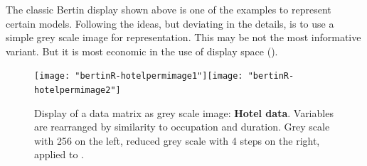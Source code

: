 \documentclass[nogin, dvips,12pt,a4paper,twoside]{amsart}
\begin{document}
The classic Bertin display shown above is one of the examples to represent certain models. Following the ideas, but deviating in the details, is to use a simple grey scale image for representation. This may be not the most informative variant. But it is most economic in the use of display space (). %

%
\begin{figure}[htbp]
\begin{center}
\texttt{[image: "bertinR-hotelpermimage1"]}\texttt{[image: "bertinR-hotelpermimage2"]}
\caption{Display of a data matrix as grey scale image: \textbf{Hotel data}. Variables are rearranged by similarity to occupation and duration. Grey scale with 256 on the left, reduced grey scale with 4 steps on the right, applied to .} 
\label{fig:hotelpermimage}
\end{center}
\end{figure}

%
%
%
%
%
%
%
%
\end{document}
